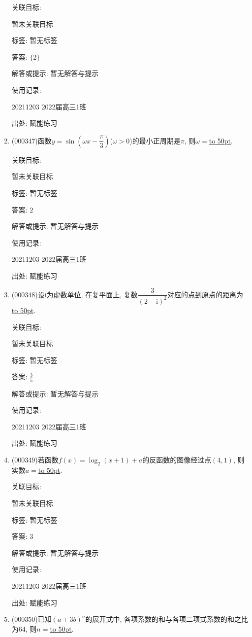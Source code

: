 \documentclass[10pt,a4paper]{article}
\newcommand{\blank}[1]{\underline{\hbox to #1pt{}}}
\begin{document}
\begin{enumerate}[1.]
关联目标:

暂未关联目标



标签: 暂无标签

答案: $\{2\}$

解答或提示: 暂无解答与提示

使用记录:

20211203	2022届高三1班	


出处: 赋能练习
\item { (000347)}函数$y=\sin (\omega x-\dfrac{\pi}{3})$($\omega >0$)的最小正周期是$\pi$, 则$\omega =$\blank{50}.


关联目标:

暂未关联目标



标签: 暂无标签

答案: $2$

解答或提示: 暂无解答与提示

使用记录:

20211203	2022届高三1班	


出处: 赋能练习
\item { (000348)}设$\mathrm{i}$为虚数单位, 在复平面上, 复数$\dfrac{3}{(2-\mathrm{i})^2}$对应的点到原点的距离为\blank{50}.


关联目标:

暂未关联目标



标签: 暂无标签

答案: $\frac 35$

解答或提示: 暂无解答与提示

使用记录:

20211203	2022届高三1班	


出处: 赋能练习
\item { (000349)}若函数$f(x)=\log_2 (x+1)+a$的反函数的图像经过点$(4,1)$, 则实数$a=$\blank{50}.


关联目标:

暂未关联目标



标签: 暂无标签

答案: $3$

解答或提示: 暂无解答与提示

使用记录:

20211203	2022届高三1班	


出处: 赋能练习
\item { (000350)}已知$(a+3b)^n$的展开式中, 各项系数的和与各项二项式系数的和之比为$64$, 则$n=$\blank{50}.



\end{enumerate}
\end{document}
